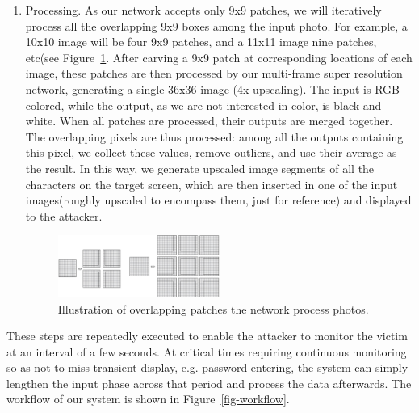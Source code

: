 \begin{enumerate}
\item Processing. As our network accepts only 9x9 patches, we will iteratively process all the overlapping 9x9 boxes among the input photo. For example, a 10x10 image will be four 9x9 patches, and a 11x11 image nine patches, etc(see Figure~\ref{fig-patches}. After carving a 9x9 patch at corresponding locations of each image, these patches are then processed by our multi-frame super resolution network, generating a single 36x36 image (4x upscaling). The input is RGB colored, while the output, as we are not interested in color, is black and white. When all patches are processed, their outputs are merged together. The overlapping pixels are thus processed: among all the outputs containing this pixel, we collect these values, remove outliers, and use their average as the result. In this way, we generate upscaled image segments of all the characters on the target screen, which are then inserted in one of the input images(roughly upscaled to encompass them, just for reference) and displayed to the attacker.

\begin{figure}
 \centering
    \includegraphics[width=0.5\textwidth]{./pic/patches.jpg}
    \caption{Illustration of overlapping patches the network process photos.}
    \label{fig-patches}
\end{figure}

\end{enumerate}

These steps are repeatedly executed to enable the attacker to monitor the victim at an interval of a few seconds. At critical times requiring continuous monitoring so as not to miss transient display, e.g. password entering, the system can simply lengthen the input phase across that period and process the data afterwards. The workflow of our system is shown in Figure~\ref{fig-workflow}.

